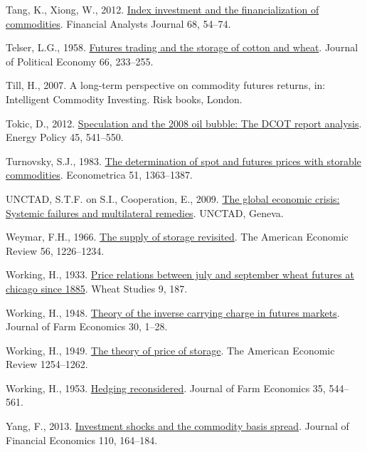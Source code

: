 \documentclass[]{elsarticle} %
\newlength{\cslhangindent}
\newlength{\cslentryspacingunit} %
\newenvironment{CSLReferences}[2] %
 {%
  \setlength{\parindent}{0pt}
  \ifodd #1
  \let\oldpar\par
  \def\par{\hangindent=\cslhangindent\oldpar}
  \fi
  \setlength{\parskip}{#2\cslentryspacingunit}
 }%
 {}
\begin{document}
\begin{CSLReferences}{1}{0}
\leavevmode{}%
Tang, K., Xiong, W., 2012. \href{https://doi.org/10.2469/faj.v68.n6.5}{Index investment and the financialization of commodities}. Financial Analysts Journal 68, 54--74.

\leavevmode{}%
Telser, L.G., 1958. \href{https://doi.org/10.1086/258036}{Futures trading and the storage of cotton and wheat}. Journal of Political Economy 66, 233--255.

\leavevmode{}%
Till, H., 2007. A long-term perspective on commodity futures returns, in: Intelligent Commodity Investing. Risk books, London.

\leavevmode{}%
Tokic, D., 2012. \href{https://doi.org/10.1016/j.enpol.2012.02.069}{Speculation and the 2008 oil bubble: The DCOT report analysis}. Energy Policy 45, 541--550.

\leavevmode{}%
Turnovsky, S.J., 1983. \href{https://doi.org/10.2307/1912279}{The determination of spot and futures prices with storable commodities}. Econometrica 51, 1363--1387.

\leavevmode{}%
UNCTAD, S.T.F. on S.I., Cooperation, E., 2009. \href{https://unctad.org/system/files/official-document/gds20091_en.pdf}{The global economic crisis: Systemic failures and multilateral remedies}. UNCTAD, Geneva.

\leavevmode{}%
Weymar, F.H., 1966. \href{http://www.jstor.org/stable/1815306}{The supply of storage revisited}. The American Economic Review 56, 1226--1234.

\leavevmode{}%
Working, H., 1933. \href{https://doi.org/10.22004/ag.econ.142876}{Price relations between july and september wheat futures at chicago since 1885}. Wheat Studies 9, 187.

\leavevmode{}%
Working, H., 1948. \href{https://doi.org/10.2307/1232678}{Theory of the inverse carrying charge in futures markets}. Journal of Farm Economics 30, 1--28.

\leavevmode{}%
Working, H., 1949. \href{https://www.jstor.org/stable/1816601}{The theory of price of storage}. The American Economic Review 1254--1262.

\leavevmode{}%
Working, H., 1953. \href{https://doi.org/10.2307/1233368}{Hedging reconsidered}. Journal of Farm Economics 35, 544--561.

\leavevmode{}%
Yang, F., 2013. \href{https://doi.org/10.1016/j.jfineco.2013.04.012}{Investment shocks and the commodity basis spread}. Journal of Financial Economics 110, 164--184.

\end{CSLReferences}
\end{document}
